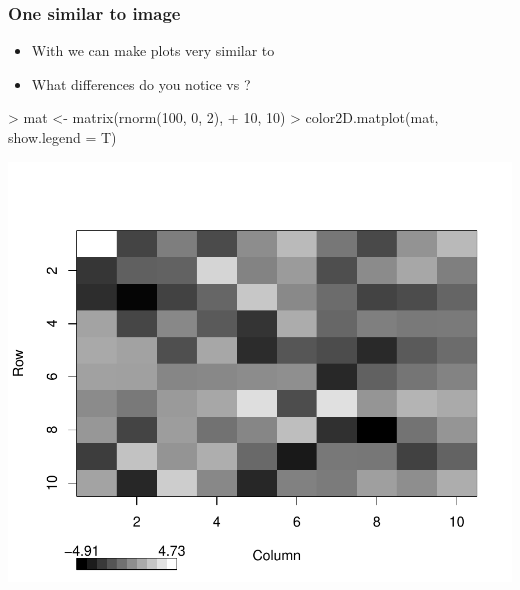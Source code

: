 \begin{frame}
  \frametitle{One similar to image}
  \begin{itemize}
  \item With  we can make plots very similar to 
  \item What differences do you notice vs ?
  \end{itemize}
\begin{Schunk}
\begin{Sinput}
> mat <- matrix(rnorm(100, 0, 2), 
+     10, 10)
> color2D.matplot(mat, show.legend = T)
\end{Sinput}
\end{Schunk}
\includegraphics{plots/fig-031}
\end{frame}


